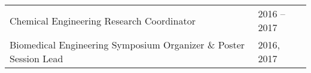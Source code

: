 \documentclass[letterpaper,11pt]{article}
\begin{document}
\begin{longtable}{@{}p{}l@{}}
  \hspace{3mm} Chemical Engineering Research Coordinator                                                                                                                                                          & 2016 -- 2017     \\
  \hspace{3mm} Biomedical Engineering Symposium Organizer \& Poster Session Lead                                                                                                                                  & 2016, 2017       \\
\end{longtable}


\end{document}
